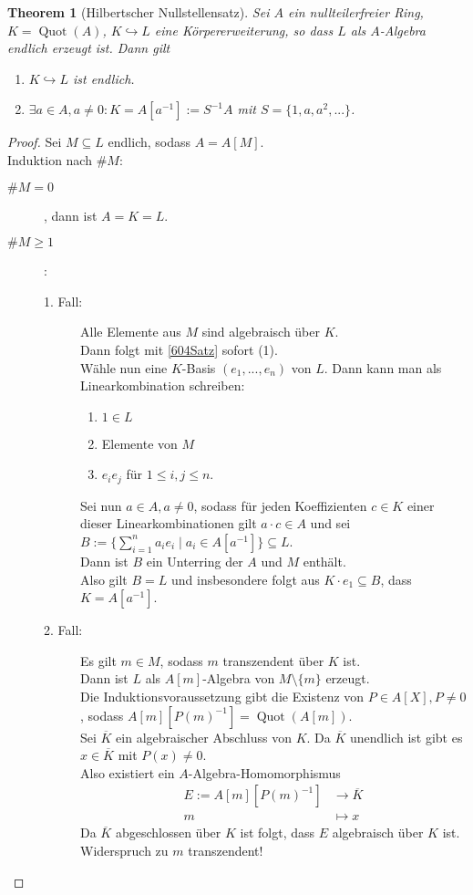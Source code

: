 \documentclass[10pt,a4paper]{article}
\newcommand{\ol}[1]{\overline{#1}}
\newcommand{\Quot}{\operatorname{Quot}}
\newcounter{thm}[section]
\theoremstyle{definition}
\theoremstyle{plain}
\newtheorem{theorem}[thm]{Theorem}
\theoremstyle{remark}
\begin{document}
\begin{theorem}[Hilbertscher Nullstellensatz]\label{1201ThmHlbNst}
	Sei $A$ ein nullteilerfreier Ring, $K=\Quot(A)$, $K\hookrightarrow L$ eine Körpererweiterung, so dass $L$ als $A$-Algebra endlich erzeugt ist. Dann gilt
	\begin{enumerate}
		\item $K\hookrightarrow L$ ist endlich.
		\item $\exists a\in A,a\neq0:K=A[a^{-1}]:=S^{-1}A$ mit $S=\{1,a,a^2,...\}$.
	\end{enumerate}
\end{theorem}
\begin{proof}
	Sei $M\subseteq L$ endlich, sodass $A=A[M]$.\\
	Induktion nach $\#M$:
	\begin{description}
		\item[$\#M=0$], dann ist $A=K=L$.
		\item[$\#M\geq 1$]:
		\begin{description}
			\item[1. Fall:] Alle Elemente aus $M$ sind algebraisch über $K$.\\
			Dann folgt mit \ref{604Satz} sofort (1).\\
			Wähle nun eine $K$-Basis $(e_1,...,e_n)$ von $L$. Dann kann man als Linearkombination schreiben:
			\begin{enumerate}
				\item $1\in L$
				\item Elemente von $M$
				\item $e_ie_j$ für $1\leq i,j\leq n$.
			\end{enumerate}
			Sei nun $a\in A,a\neq 0$, sodass für jeden Koeffizienten $c\in K$ einer dieser Linearkombinationen gilt $a\cdot c\in A$ und sei $B:=\{\sum_{i=1}^{n}a_ie_i\mid a_i\in A[a^{-1}]\}\subseteq L$.\\
			Dann ist $B$ ein Unterring der $A$ und $M$ enthält.\\
			Also gilt $B=L$ und insbesondere folgt aus $K\cdot e_1\subseteq B$, dass $K=A[a^{-1}]$.
			\item[2. Fall:] Es gilt $m\in M$, sodass $m$ transzendent über $K$ ist. \\
			Dann ist $L$ als $A[m]$-Algebra von $M\setminus\{m\}$ erzeugt.\\
			Die Induktionsvoraussetzung gibt die Existenz von $P\in A[X],P\neq 0$, sodass $A[m][P(m)^{-1}]=\Quot(A[m])$.\\
			Sei $\ol K$ ein algebraischer Abschluss von $K$. Da $\ol K$ unendlich ist gibt es $x\in\ol K$ mit $P(x)\neq 0$.\\
			Also existiert ein $A$-Algebra-Homomorphismus 
			\begin{align*}
			E:=A[m][P(m)^{-1}]&\to \ol K\\ m&\mapsto x
			\end{align*}
			Da $\ol K$ abgeschlossen über $K$ ist folgt, dass $E$ algebraisch über $K$ ist. Widerspruch zu $m$ transzendent!
		\end{description}
	\end{description}
\end{proof}
\end{document}
